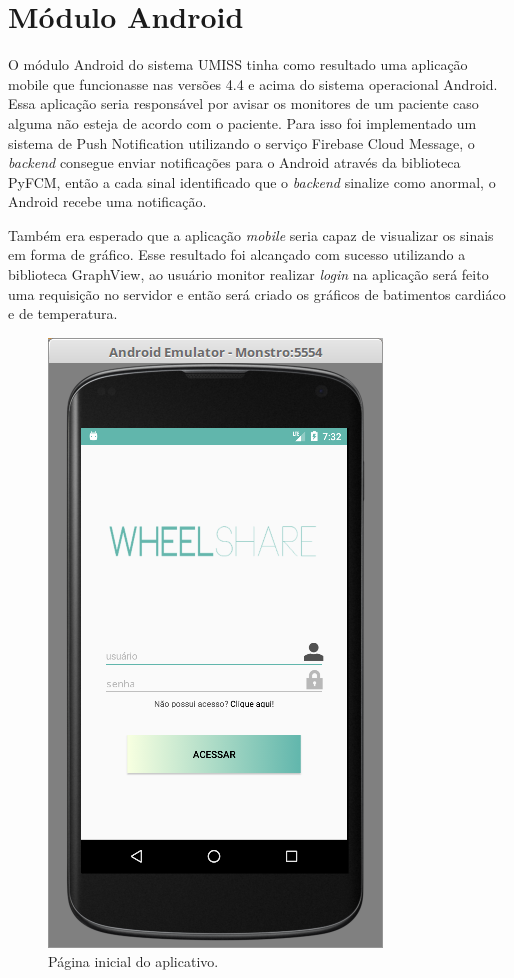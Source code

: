 \section{Módulo Android}

O módulo Android do sistema UMISS tinha como resultado uma aplicação mobile que 
funcionasse nas versões 4.4 e acima do sistema operacional Android. Essa aplicação
seria responsável por avisar os monitores de um paciente caso alguma não esteja de
acordo com o paciente. Para isso foi implementado um sistema de Push Notification
utilizando o serviço Firebase Cloud Message, o \textit{backend} consegue enviar 
notificações para o Android através da biblioteca PyFCM, então a cada sinal identificado
que o \textit{backend} sinalize como anormal, o Android recebe uma notificação.

Também era esperado que a aplicação \textit{mobile} seria capaz de visualizar
os sinais em forma de gráfico. Esse resultado foi alcançado com sucesso utilizando
a biblioteca GraphView, ao usuário monitor realizar \textit{login} na aplicação será
feito uma requisição no servidor e então será criado os gráficos de batimentos cardiáco
e de temperatura.

\begin{figure}[h!]
    \begin{center}
        \includegraphics[scale=0.5]{figuras/android2.png}
    \end{center}
    \caption{Página inicial do aplicativo.}
    \label{fig:android2}
\end{figure}

